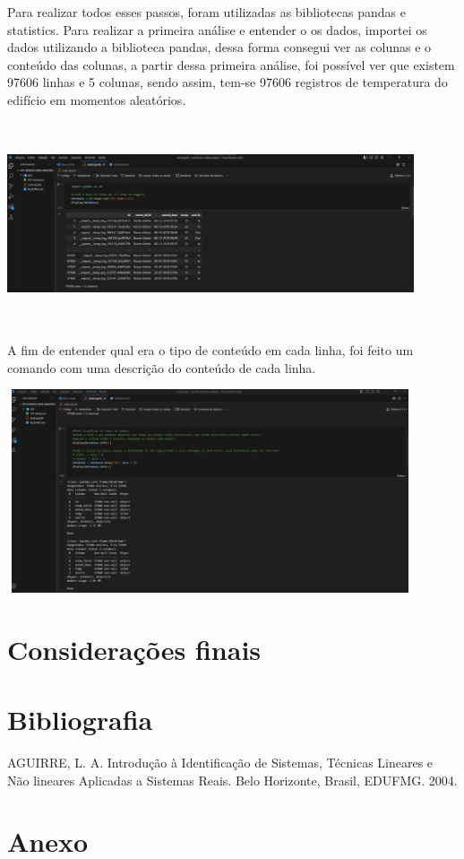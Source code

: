 \documentclass[a4paper, 12pt]{article}
\begin{document}
Para realizar todos esses passos, foram utilizadas as bibliotecas pandas e statistics. Para realizar a primeira análise e entender o os dados, importei os dados utilizando a biblioteca pandas, dessa forma consegui ver as colunas e o conteúdo das colunas, a partir dessa primeira análise, foi possível ver que existem 97606 linhas e 5 colunas, sendo assim, tem-se 97606 registros de temperatura do edifício em momentos aleatórios.

\includegraphics[width=12cm, height=6cm]{img 01.jpg}

A fim de entender qual era o tipo de conteúdo em cada linha, foi feito um comando com uma descrição do conteúdo de cada linha.

\includegraphics[width=12cm, height=6cm]{img 02.jpg}


\newpage
\section{Considerações finais}
\newpage

\section*{Bibliografia}
\footnotesize{

\noindent AGUIRRE, L. A. Introdução à Identificação de Sistemas, Técnicas Lineares e Não lineares Aplicadas a Sistemas Reais. Belo Horizonte, Brasil, EDUFMG. 2004.\\

}
\newpage
{}
\section*{Anexo}
\end{document}
